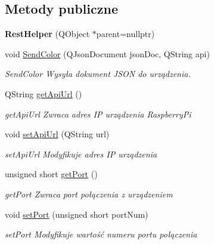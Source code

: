 \subsection*{Metody publiczne}
\begin{DoxyCompactItemize}
\item 
\mbox{\label{class_rest_helper_a52a1010ef31bfab8cafe7742c6206f71}} 
{\bfseries Rest\+Helper} (Q\+Object $\ast$parent=nullptr)
\item 
void \mbox{\hyperlink{class_rest_helper_ab27c5c6fdbe8f25c1b4a288a983f7995}{Send\+Color}} (Q\+Json\+Document json\+Doc, Q\+String api)
\begin{DoxyCompactList}\small\item\em Send\+Color Wysyła dokument J\+S\+ON do urządzenia. \end{DoxyCompactList}\item 
Q\+String \mbox{\hyperlink{class_rest_helper_ad6c71fc30c6377e10f465038b6b06c4c}{get\+Api\+Url}} ()
\begin{DoxyCompactList}\small\item\em get\+Api\+Url Zwraca adres IP urządzenia Raspberry\+Pi \end{DoxyCompactList}\item 
void \mbox{\hyperlink{class_rest_helper_ae0812d7e48940885625f939cf56b4072}{set\+Api\+Url}} (Q\+String url)
\begin{DoxyCompactList}\small\item\em set\+Api\+Url Modyfikuje adres IP urządzenia \end{DoxyCompactList}\item 
unsigned short \mbox{\hyperlink{class_rest_helper_ac4de88ea9cfe823ca317c87e99729b8c}{get\+Port}} ()
\begin{DoxyCompactList}\small\item\em get\+Port Zwraca port połączenia z urządzeniem \end{DoxyCompactList}\item 
void \mbox{\hyperlink{class_rest_helper_ac7748378a6d1dcfddf7dc5b803f9d4b2}{set\+Port}} (unsigned short port\+Num)
\begin{DoxyCompactList}\small\item\em set\+Port Modyfikuje wartość numeru portu połączenia \end{DoxyCompactList}\end{DoxyCompactItemize}
